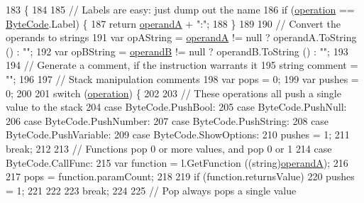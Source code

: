 \begin{DoxyCode}
183                                                       \{
184 
185             \textcolor{comment}{// Labels are easy: just dump out the name}
186             \textcolor{keywordflow}{if} (\hyperlink{a00095_a566bf5f7198cc353ea5c3710cb3a31cb}{operation} == \hyperlink{a00031_ad5dfb6ee68ca7469623ad3e459f98894}{ByteCode}.Label) \{
187                 \textcolor{keywordflow}{return} \hyperlink{a00095_ab5d386faa0d3dbc23db80f8e62706afd}{operandA} + \textcolor{stringliteral}{":"};
188             \}
189 
190             \textcolor{comment}{// Convert the operands to strings}
191             var opAString = \hyperlink{a00095_ab5d386faa0d3dbc23db80f8e62706afd}{operandA} != null ? operandA.ToString () : \textcolor{stringliteral}{""};
192             var opBString = \hyperlink{a00095_a56348c6fe7eb919b7277afc06e5b224a}{operandB} != null ? operandB.ToString () : \textcolor{stringliteral}{""};
193 
194             \textcolor{comment}{// Generate a comment, if the instruction warrants it}
195             \textcolor{keywordtype}{string} comment = \textcolor{stringliteral}{""};
196 
197             \textcolor{comment}{// Stack manipulation comments}
198             var pops = 0;
199             var pushes = 0;
200 
201             \textcolor{keywordflow}{switch} (\hyperlink{a00095_a566bf5f7198cc353ea5c3710cb3a31cb}{operation}) \{
202 
203             \textcolor{comment}{// These operations all push a single value to the stack}
204             \textcolor{keywordflow}{case} ByteCode.PushBool:
205             \textcolor{keywordflow}{case} ByteCode.PushNull:
206             \textcolor{keywordflow}{case} ByteCode.PushNumber:
207             \textcolor{keywordflow}{case} ByteCode.PushString:
208             \textcolor{keywordflow}{case} ByteCode.PushVariable:
209             \textcolor{keywordflow}{case} ByteCode.ShowOptions:
210                 pushes = 1;
211                 \textcolor{keywordflow}{break};
212 
213             \textcolor{comment}{// Functions pop 0 or more values, and pop 0 or 1 }
214             \textcolor{keywordflow}{case} ByteCode.CallFunc:
215                 var \textcolor{keyword}{function} = l.GetFunction ((string)\hyperlink{a00095_ab5d386faa0d3dbc23db80f8e62706afd}{operandA});
216 
217                 pops = function.paramCount;
218 
219                 \textcolor{keywordflow}{if} (\textcolor{keyword}{function}.returnsValue)
220                     pushes = 1;
221                 
222 
223                 \textcolor{keywordflow}{break};
224             
225             \textcolor{comment}{// Pop always pops a single value}

\end{DoxyCode}

